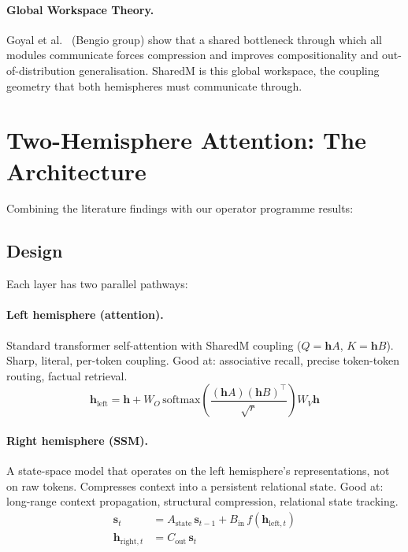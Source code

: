 \documentclass[11pt, a4paper]{article}
\newcommand{\h}{\mathbf{h}}
\theoremstyle{plain}
\theoremstyle{definition}
\theoremstyle{remark}
\begin{document}
\paragraph{Global Workspace Theory.}
Goyal et al.~\cite{goyal2022global} (Bengio group) show that a shared bottleneck through which all modules communicate forces compression and improves compositionality and out-of-distribution generalisation.
SharedM is this global workspace, the coupling geometry that both hemispheres must communicate through.


\section{Two-Hemisphere Attention: The Architecture}
\label{sec:two-hemi-arch}

Combining the literature findings with our operator programme results:

\subsection{Design}

Each layer has two parallel pathways:

\paragraph{Left hemisphere (attention).}
Standard transformer self-attention with SharedM coupling ($Q = \h A$, $K = \h B$).
Sharp, literal, per-token coupling.
Good at: associative recall, precise token-token routing, factual retrieval.
\begin{equation}
\h_{\mathrm{left}} = \h + W_O \, \mathrm{softmax}\!\left(\frac{(\h A)(\h B)^\top}{\sqrt{r}}\right) W_V \h
\end{equation}

\paragraph{Right hemisphere (SSM).}
A state-space model that operates on the left hemisphere's representations, not on raw tokens.
Compresses context into a persistent relational state.
Good at: long-range context propagation, structural compression, relational state tracking.
\begin{align}
\mathbf{s}_t &= A_{\mathrm{state}} \, \mathbf{s}_{t-1} + B_{\mathrm{in}} \, f(\h_{\mathrm{left},t}) \\
\h_{\mathrm{right},t} &= C_{\mathrm{out}} \, \mathbf{s}_t
\end{align}
\end{document}
